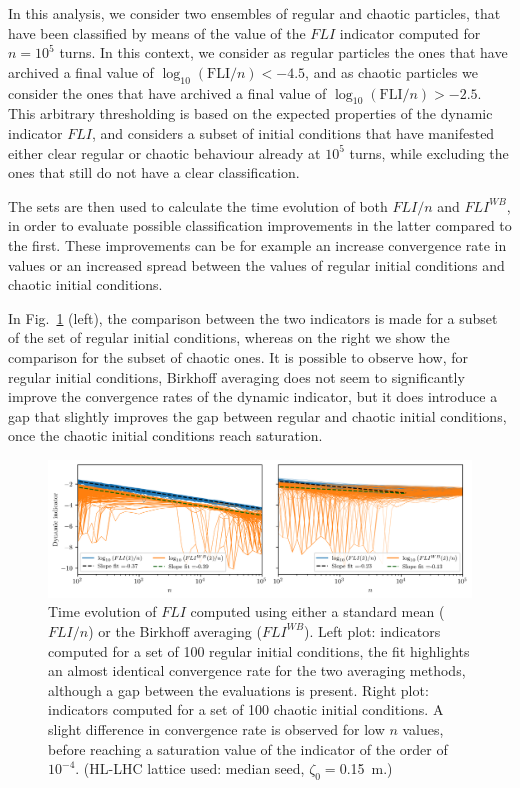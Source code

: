 In this analysis, we consider two ensembles of regular and chaotic particles, that have been classified by means of the value of the $FLI$ indicator computed for $n=10^5$ turns. In this context, we consider as regular particles the ones that have archived a final value of $\log_{10}(\mathrm{FLI}/n) < -4.5$, and as chaotic particles we consider the ones that have archived a final value of $\log_{10}(\mathrm{FLI}/n) > -2.5$. This arbitrary thresholding is based on the expected properties of the dynamic indicator $FLI$, and considers a subset of initial conditions that have manifested either clear regular or chaotic behaviour already at $10^5$ turns, while excluding the ones that still do not have a clear classification.

The sets are then used to calculate the time evolution of both $FLI/n$ and $FLI^{WB}$, in order to evaluate possible classification improvements in the latter compared to the first. These improvements can be for example an increase convergence rate in values or an increased spread between the values of regular initial conditions and chaotic initial conditions.

In Fig.~\ref{fig:fli_compare_mean_birk} (left), the comparison between the two indicators is made for a subset of the set of regular initial conditions, whereas on the right we show the comparison for the subset of chaotic ones. It is possible to observe how, for regular initial conditions, Birkhoff averaging does not seem to significantly improve the convergence rates of the dynamic indicator, but it does introduce a gap that slightly improves the gap between regular and chaotic initial conditions, once the chaotic initial conditions reach saturation.

\begin{figure}[htp]
    \centering
    \includegraphics[width=1.0\textwidth]{6_lhc_dynamic_indicators/figs/fli_vs_flibk_idx_4.png}
    \caption{Time evolution of $FLI$ computed using either a standard mean ($FLI/n$) or the Birkhoff averaging ($FLI^{WB}$). Left plot: indicators computed for a set of 100 regular initial conditions, the fit highlights an almost identical convergence rate for the two averaging methods, although a gap between the evaluations is present. Right plot: indicators computed for a set of 100 chaotic initial conditions. A slight difference in convergence rate is observed for low $n$ values, before reaching a saturation value of the indicator of the order of $10^{-4}$. (HL-LHC lattice used: median seed, $\zeta_0=$\SI{0.15}{\meter}.)}
    \label{fig:fli_compare_mean_birk}
\end{figure}

